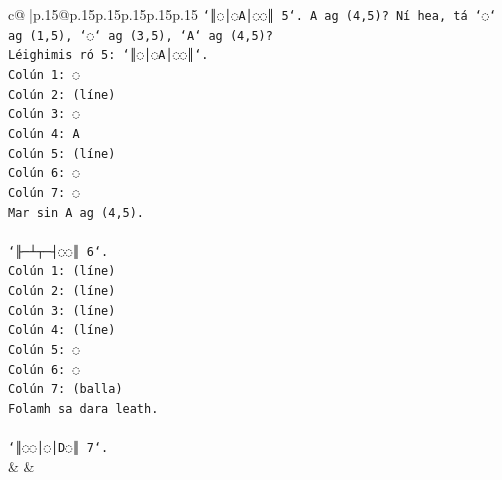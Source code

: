 \documentclass{article}
\begin{document}
{\begin{supertabular}{c@{$\;$}|p{.15\linewidth}@{}p{.15\linewidth}p{.15\linewidth}p{.15\linewidth}p{.15\linewidth}p{.15\linewidth}}
{{{\texttt{`║◌│◌A│◌◌║ 5`. A ag (4,5)? Ní hea, tá `◌` ag (1,5), `◌` ag (3,5), `A` ag (4,5)?} \\
\texttt{Léighimis ró 5: `║◌│◌A│◌◌║`.} \\
\texttt{Colún 1: ◌} \\
\texttt{Colún 2: (líne)} \\
\texttt{Colún 3: ◌} \\
\texttt{Colún 4: A} \\
\texttt{Colún 5: (líne)} \\
\texttt{Colún 6: ◌} \\
\texttt{Colún 7: ◌} \\
\texttt{Mar sin A ag (4,5).} \\
\\ 
\texttt{`╟─┴┬─┤◌◌║ 6`.} \\
\texttt{Colún 1: (líne)} \\
\texttt{Colún 2: (líne)} \\
\texttt{Colún 3: (líne)} \\
\texttt{Colún 4: (líne)} \\
\texttt{Colún 5: ◌} \\
\texttt{Colún 6: ◌} \\
\texttt{Colún 7: (balla)} \\
\texttt{Folamh sa dara leath.} \\
\\ 
\texttt{`║◌◌│◌│D◌║ 7`.} \\
            }
        }
    }
    & & \\ \\


\end{supertabular}}
\end{document}
